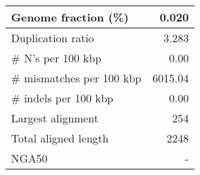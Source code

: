\documentclass[12pt,a4paper]{article}
\begin{document}
\begin{table}[ht]
\begin{center}
\begin{tabular}{|l*{1}{|r}|}
Genome fraction (\%) & 0.020 \\ \hline
Duplication ratio & 3.283 \\ \hline
\# N's per 100 kbp & 0.00 \\ \hline
\# mismatches per 100 kbp & 6015.04 \\ \hline
\# indels per 100 kbp & 0.00 \\ \hline
Largest alignment & 254 \\ \hline
Total aligned length & 2248 \\ \hline
NGA50 & - \\ \hline
\end{tabular}
\end{center}
\end{table}
\end{document}
